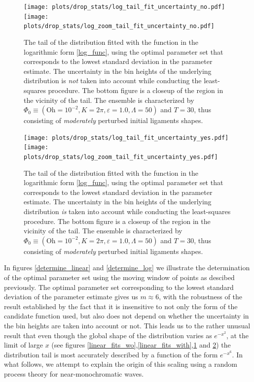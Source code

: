 \begin{figure}
\centering
\texttt{[image: plots/drop\_stats/log\_tail\_fit\_uncertainty\_no.pdf]} \\
\texttt{[image: plots/drop\_stats/log\_zoom\_tail\_fit\_uncertainty\_no.pdf]} \\ 
\caption{
	The tail of the distribution fitted with the function 
	in the logarithmic form \eqref{log_func}, using the optimal parameter
	set that corresponds to the lowest standard deviation in the parameter estimate.
	The uncertainty in the bin heights of the underlying distribution is \textit{not}
	taken into account while conducting the least-squares procedure. 
	The bottom figure is a closeup of the region in the vicinity of the tail.
	The ensemble is characterized by $\Phi_0 \equiv \left( \textrm{Oh} = 10^{-2}, K = 2\pi 
	, \varepsilon = 1.0 , \Lambda = 50 \right)$ and $T = 30$, 
	thus consisting of \textit{moderately} perturbed initial ligaments shapes. 
	}
\label{log_fits_wo}
\end{figure}



\begin{figure}
\centering
\texttt{[image: plots/drop\_stats/log\_tail\_fit\_uncertainty\_yes.pdf]} \\
\texttt{[image: plots/drop\_stats/log\_zoom\_tail\_fit\_uncertainty\_yes.pdf]} \\ 
\caption{
	The tail of the distribution fitted with the function 
	in the logarithmic form \eqref{log_func}, using the optimal parameter
	set that corresponds to the lowest standard deviation in the parameter estimate.
	The uncertainty in the bin heights of the underlying distribution \textit{is} 
	taken into account while conducting the least-squares procedure. 
	The bottom figure is a closeup of the region in the vicinity of the tail.
	The ensemble is characterized by $\Phi_0 \equiv \left( \textrm{Oh} = 10^{-2}, K = 2\pi 
	, \varepsilon = 1.0 , \Lambda = 50 \right)$ and $T = 30$, 
	thus consisting of \textit{moderately} perturbed initial ligaments shapes. 
	}
\label{log_fits_with}
\end{figure}

In figures \ref{determine_linear} and \ref{determine_log} we illustrate the determination
of the optimal parameter set using the moving window of points as descibed previously.
The optimal parameter set corresponding to the lowest standard deviation of the parameter estimate
gives us $m \approx 6$, with the robustness of the result established by the fact that 
it is insensitive to not only the form of the candidate function used, but also does not depend 
on whether the uncertainty in the bin heights are taken into account or not.
This leads us to the rather unusual result that even though the global shape of 
the distribution varies as $e^{-x^2}$, at the limit of large $x$ 
(see figures \ref{linear_fits_wo},\ref{linear_fits_with},\ref{log_fits_wo} and \ref{log_fits_with})
the distribution tail is most accurately described by a function of the form $e^{-x^6}$.
In what follows, we attempt to explain the origin of this scaling
using a random process theory for near-monochromatic waves. 

